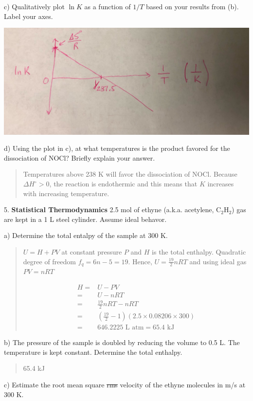 \documentclass[11pt]{article}
\newcommand{\brian}[1]{
  {\begin{quote}
      \color{blue} #1
  \end{quote}}
}
\begin{document}
c) Qualitatively plot $\ln K$ as a function of $1/T$ based on your results from (b). {\color{blue}
  Label your axes.}

\begin{center}
  \includegraphics[scale=0.1]{vant_hoff.jpeg}
\end{center}

{\color{blue} d) Using the plot in c), at what temperatures is the product favored for the
  dissociation of NOCl? Briefly explain your answer.}

\brian{Temperatures above 238 K will favor the dissociation of NOCl. Because $\Delta H^\circ > 0$,
  the reaction is endothermic and this means that $K$ increases with increasing temperature.
}

5. \textbf{Statistical Thermodynamics} 2.5 mol of ethyne (a.k.a. acetylene, C$_2$H$_2$) gas
are kept in a 1 L steel cylinder. Assume ideal behavor.

a) Determine the total entalpy of the sample at 300 K.

\brian{$U = H + PV$ at constant pressure $P$ and $H$ is the total enthalpy. Quadratic degree
  of freedom $f_q = 6n-5 = 19$. Hence, $U = \frac{19}{2}nRT$ and using ideal gas $PV = nRT$

  \begin{align*}
    H = & U - PV \\
    = & U - nRT \\
    = & \frac{19}{2}nRT - nRT \\
    = & (\frac{19}{2} - 1)(2.5\times 0.08206 \times 300) \\
    = & 646.2225 \text{ L atm} = 65.4 \text{ kJ}
  \end{align*}  
}

b) The pressure of the sample is doubled by reducing the volume to 0.5 L. The
temperature is kept constant. Determine the total enthalpy.

\brian{65.4 kJ}

c) Estimate the {\color{blue} root mean square} {\color{red} \sout{rms}} velocity of the ethyne
molecules in m/s at 300 K.
\end{document}
